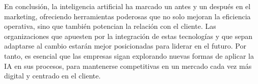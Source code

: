 \documentclass[9pt]{article}
\begin{document}
En conclusión, la inteligencia artificial ha marcado un antes y un después en el marketing, ofreciendo herramientas poderosas que no solo mejoran la eficiencia operativa, sino que también potencian la relación con el cliente. Las organizaciones que apuesten por la integración de estas tecnologías y que sepan adaptarse al cambio estarán mejor posicionadas para liderar en el futuro. Por tanto, es esencial que las empresas sigan explorando nuevas formas de aplicar la IA en sus procesos, para mantenerse competitivas en un mercado cada vez más digital y centrado en el cliente.


\newpage

\printbibliography
\end{document}
